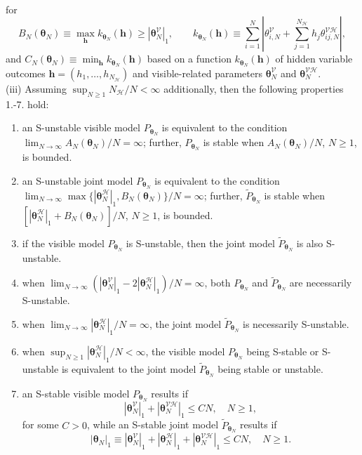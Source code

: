 \documentclass[12pt]{article}
\theoremstyle{definition}
\newcommand{\elt}{A_{N}(\boldsymbol \theta_N) }
\newcommand{\Gam}{B_{N}(\boldsymbol \theta_N) }
\newcommand{\Gamc}{C_{N}(\boldsymbol \theta_N) }
\begin{document}
\begin{proposition1}
{\begin{eqnarray*}
\end{eqnarray*}
for
\[
\Gam \equiv \max_{ \boldsymbol h} k_{\boldsymbol \theta_N} (\boldsymbol h)
 \geq  |\boldsymbol \theta_N^{\mathcal{V}} |_{1},\qquad  k_{\boldsymbol \theta_N} (\boldsymbol h)  \equiv \sum_{i=1}^{N }\left| \theta_{i,N}^{\mathcal{V}}   + \sum_{j=1}^{N_{\mathcal{H}}} h_j \theta_{ij,N}^{\mathcal{VH}} \right|,\] and $\Gamc \equiv \min_{ \boldsymbol h} k_{\boldsymbol \theta_N} (\boldsymbol h)$    based on a function  $ k_{\boldsymbol \theta_N} (\boldsymbol h) $ of hidden variable outcomes $\boldsymbol h = (h_1,\ldots,h_{N_{\mathcal{H}}})$ and visible-related parameters $\boldsymbol \theta_N^{\mathcal{V}}$ and $\boldsymbol \theta_N^{\mathcal{VH}}$.\\
\noindent (iii) Assuming   $\sup_{N \geq 1} N_{\mathcal{H}}/N<\infty$ additionally, then the following properties 1.-7. hold:
\begin{enumerate} \itemsep 0cm
  \item an S-unstable visible model $P_{\boldsymbol \theta_N}$ is equivalent to the condition $\lim_{N\to \infty}  \elt/N  =\infty$; further,  $P_{\boldsymbol \theta_N}$ is stable when
$\elt/N$, $N \geq 1$, is bounded.
\item an S-unstable joint model $P_{\boldsymbol \theta_N}$ is equivalent to the condition $\lim_{N\to \infty} \max\{|\boldsymbol \theta_N^{\mathcal{H}}|_1, \Gam\}/N =\infty$; further,  $\tilde{P}_{\boldsymbol \theta_N}$ is stable when
$[|\boldsymbol \theta_N^{\mathcal{H}}|_1+ \Gam]/N$, $N \geq 1$, is bounded.
\item if the visible model $P_{\boldsymbol \theta_N}$   is S-unstable, then  the joint model $\tilde{P}_{\boldsymbol \theta_N}$ is also S-unstable.
\item when $\lim_{N\to \infty}  (|\boldsymbol \theta_N^{\mathcal{V}}|_1-2|\boldsymbol \theta_N^{\mathcal{H}}|_1)/N =\infty$,   both
$P_{\boldsymbol \theta_N}$ and $\tilde{P}_{\boldsymbol \theta_N}$ are necessarily S-unstable.
\item when $\lim_{N\to \infty}  |\boldsymbol \theta_N^{\mathcal{H}}|_1/N =\infty$,  the joint model $\tilde{P}_{\boldsymbol \theta_N}$ is necessarily S-unstable.
\item when $\sup_{N \geq 1} |\boldsymbol \theta_N^{\mathcal{H}}|_1 /N<\infty$,
 the visible model $P_{\boldsymbol \theta_N}$  being S-stable or S-unstable is equivalent to the joint model  $\tilde{P}_{\boldsymbol \theta_N}$ being stable or unstable.
\item  an S-stable visible model $P_{\boldsymbol \theta_N}$  results if
\[
         |\boldsymbol \theta_N^{\mathcal{V}}|_1+ |\boldsymbol \theta_N^{\mathcal{VH}} |_1  \leq CN,\quad N \geq 1,
 \]
for some $C>0$, while an S-stable joint model $\tilde{P}_{\boldsymbol \theta_N}$  results if
 \[
        |\boldsymbol \theta_N|_1 \equiv  |\boldsymbol \theta_N^{\mathcal{V}}|_1+|\boldsymbol \theta_N^{\mathcal{H}}|_1 +|\boldsymbol \theta_N^{\mathcal{VH}} |_1  \leq  C N ,\quad N \geq 1.
 \]
\end{enumerate}}
\end{proposition1}
\end{document}

